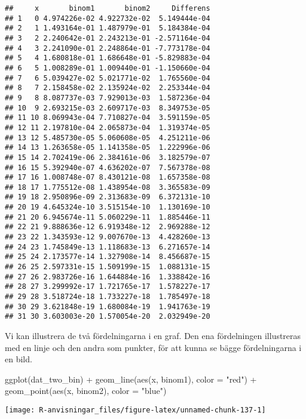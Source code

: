 \documentclass[
]{book}
\newenvironment{Shaded}{\begin{snugshade}}{\end{snugshade}}
\newcommand{\AttributeTok}[1]{\textcolor[rgb]{0.77,0.63,0.00}{#1}}
\newcommand{\FunctionTok}[1]{\textcolor[rgb]{0.00,0.00,0.00}{#1}}
\newcommand{\NormalTok}[1]{#1}
\newcommand{\SpecialCharTok}[1]{\textcolor[rgb]{0.00,0.00,0.00}{#1}}
\newcommand{\StringTok}[1]{\textcolor[rgb]{0.31,0.60,0.02}{#1}}
\theoremstyle{definition}
\theoremstyle{definition}
\theoremstyle{definition}
\theoremstyle{definition}
\theoremstyle{remark}
\begin{document}
\begin{verbatim}
##     x       binom1       binom2     Differens
## 1   0 4.974226e-02 4.922732e-02  5.149444e-04
## 2   1 1.493164e-01 1.487979e-01  5.184384e-04
## 3   2 2.240642e-01 2.243213e-01 -2.571164e-04
## 4   3 2.241090e-01 2.248864e-01 -7.773178e-04
## 5   4 1.680818e-01 1.686648e-01 -5.829883e-04
## 6   5 1.008289e-01 1.009440e-01 -1.150660e-04
## 7   6 5.039427e-02 5.021771e-02  1.765560e-04
## 8   7 2.158458e-02 2.135924e-02  2.253344e-04
## 9   8 8.087737e-03 7.929013e-03  1.587236e-04
## 10  9 2.693215e-03 2.609717e-03  8.349753e-05
## 11 10 8.069943e-04 7.710827e-04  3.591159e-05
## 12 11 2.197810e-04 2.065873e-04  1.319374e-05
## 13 12 5.485730e-05 5.060608e-05  4.251211e-06
## 14 13 1.263658e-05 1.141358e-05  1.222996e-06
## 15 14 2.702419e-06 2.384161e-06  3.182579e-07
## 16 15 5.392940e-07 4.636202e-07  7.567378e-08
## 17 16 1.008748e-07 8.430121e-08  1.657358e-08
## 18 17 1.775512e-08 1.438954e-08  3.365583e-09
## 19 18 2.950896e-09 2.313683e-09  6.372131e-10
## 20 19 4.645324e-10 3.515154e-10  1.130169e-10
## 21 20 6.945674e-11 5.060229e-11  1.885446e-11
## 22 21 9.888636e-12 6.919348e-12  2.969288e-12
## 23 22 1.343593e-12 9.007670e-13  4.428260e-13
## 24 23 1.745849e-13 1.118683e-13  6.271657e-14
## 25 24 2.173577e-14 1.327908e-14  8.456687e-15
## 26 25 2.597331e-15 1.509199e-15  1.088131e-15
## 27 26 2.983726e-16 1.644884e-16  1.338842e-16
## 28 27 3.299992e-17 1.721765e-17  1.578227e-17
## 29 28 3.518724e-18 1.733227e-18  1.785497e-18
## 30 29 3.621848e-19 1.680084e-19  1.941763e-19
## 31 30 3.603003e-20 1.570054e-20  2.032949e-20
\end{verbatim}

Vi kan illustrera de två fördelningarna i en graf. Den ena fördelningen illustreras med en linje och den andra som punkter, för att kunna se bägge fördelningarna i en bild.

\begin{Shaded}
\begin{Highlighting}[]
\FunctionTok{ggplot}\NormalTok{(dat\_two\_bin) }\SpecialCharTok{+}
  \FunctionTok{geom\_line}\NormalTok{(}\FunctionTok{aes}\NormalTok{(x, binom1), }\AttributeTok{color =} \StringTok{"red"}\NormalTok{) }\SpecialCharTok{+}
  \FunctionTok{geom\_point}\NormalTok{(}\FunctionTok{aes}\NormalTok{(x, binom2), }\AttributeTok{color =} \StringTok{"blue"}\NormalTok{)}
\end{Highlighting}
\end{Shaded}

\begin{center}\texttt{[image: R-anvisningar\_files/figure-latex/unnamed-chunk-137-1]} \end{center}
\end{document}
